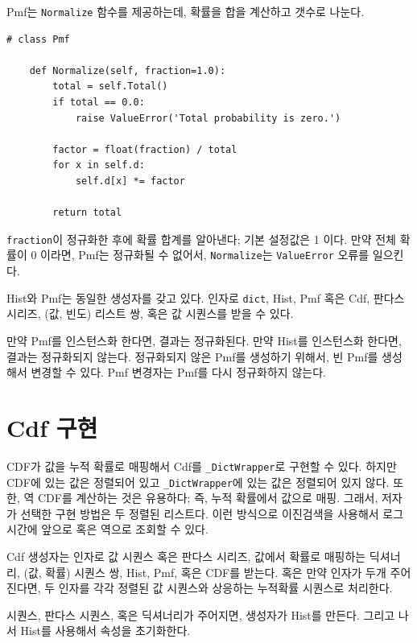 Pmf는 {\tt Normalize} 함수를 제공하는데, 확률을 합을 계산하고 갯수로 나눈다.

\begin{verbatim}
# class Pmf

    def Normalize(self, fraction=1.0):
        total = self.Total()
        if total == 0.0:
            raise ValueError('Total probability is zero.')

        factor = float(fraction) / total
        for x in self.d:
            self.d[x] *= factor

        return total
\end{verbatim}

{\tt fraction}이 정규화한 후에 확률 합계를 알아낸다; 기본 설정값은 1 이다.
만약 전체 확률이 0 이라면, Pmf는 정규화될 수 없어서, {\tt Normalize}는 {\tt ValueError} 오류를 일으킨다.

Hist와 Pmf는 동일한 생성자를 갖고 있다.
인자로 {\tt dict}, Hist, Pmf 혹은 Cdf, 
판다스 시리즈, (값, 빈도) 리스트 쌍, 혹은 값 시퀀스를 받을 수 있다.

만약 Pmf를 인스턴스화 한다면, 결과는 정규화된다.
만약 Hist를 인스턴스화 한다면, 결과는 정규화되지 않는다.
정규화되지 않은 Pmf를 생성하기 위해서, 빈 Pmf를  생성해서 변경할 수 있다. Pmf 변경자는 Pmf를 다시 정규화하지 않는다.

\section{Cdf 구현}

CDF가 값을 누적 확률로 매핑해서 Cdf를 \verb"_DictWrapper"로 구현할 수 있다. 하지만 CDF에 있는 값은 정렬되어 있고 \verb"_DictWrapper"에 있는 값은 정렬되어 있지 않다.
또한, 역 CDF를 계산하는 것은 유용하다; 즉, 누적 확률에서 값으로 매핑. 그래서, 저자가 선택한 구현 방법은 두 정렬된 리스트다.
이런 방식으로 이진검색을 사용해서 로그 시간에 앞으로 혹은 역으로 조회할 수 있다.


Cdf 생성자는 인자로 값 시퀀스 혹은 판다스 시리즈, 값에서 확률로 매핑하는 딕셔너리, (값, 확률) 시퀀스 쌍, Hist, Pmf, 혹은 CDF를 받는다. 혹은 만약 인자가 두개 주어진다면, 두 인자를 각각 정렬된 값 시퀀스와 상응하는 누적확률 시퀀스로 처리한다.

시퀀스, 판다스 시퀀스, 혹은 딕셔너리가 주어지면, 생성자가 Hist를 만든다. 그리고 나서 Hist를 사용해서 속성을 초기화한다.

